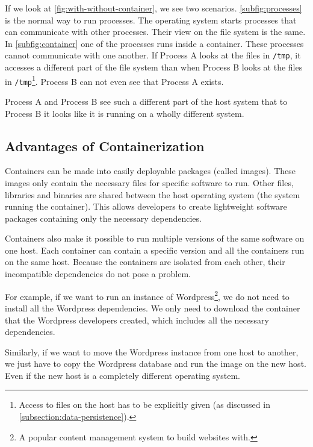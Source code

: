 If we look at \autoref{fig:with-without-container}, we see two scenarios. \autoref{subfig:processes} is the normal way to run processes. The operating system starts processes that can communicate with other processes. Their view on the file system is the same.
In \autoref{subfig:container} one of the processes runs inside a container. These processes cannot communicate with one another. If Process A looks at the files in \lstinline{/tmp}, it accesses a different part of the file system than when Process B looks at the files in \lstinline{/tmp}\footnote{Access to files on the host has to be explicitly given (as discussed in \autoref{subsection:data-persistence}).}. Process B can not even see that Process A exists.

\medskip

Process A and Process B see such a different part of the host system that to Process B it looks like it is running on a wholly different system.

\subsection{Advantages of Containerization}
Containers can be made into easily deployable packages (called images). These images only contain the necessary files for specific software to run. Other files, libraries and binaries are shared between the host operating system (the system running the container). This allows developers to create lightweight software packages containing only the necessary dependencies.

\medskip

Containers also make it possible to run multiple versions of the same software on one host. Each container can contain a specific version and all the containers run on the same host. Because the containers are isolated from each other, their incompatible dependencies do not pose a problem.

\medskip

For example, if we want to run an instance of Wordpress\footnote{A popular content management system to build websites with.}, we do not need to install all the Wordpress dependencies. We only need to download the container that the Wordpress developers created, which includes all the necessary dependencies.

Similarly, if we want to move the Wordpress instance from one host to another, we just have to copy the Wordpress database and run the image on the new host. Even if the new host is a completely different operating system.

